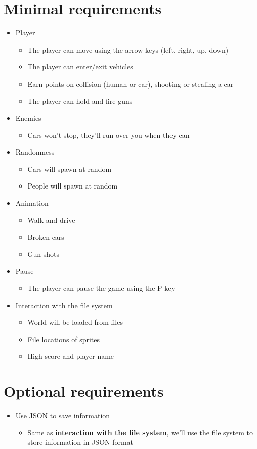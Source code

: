 \documentclass[12pt]{article}
\begin{document}
	\section{Minimal requirements}
	\begin{itemize}
		\item Player
			\begin{itemize}
				\item The player can move using the arrow keys (left, right, up, down)
				\item The player can enter/exit vehicles
				\item Earn points on collision (human or car), shooting or stealing a car
				\item The player can hold and fire guns
			\end{itemize}
		\item Enemies
			\begin{itemize}
				\item Cars won't stop, they'll run over you when they can
			\end{itemize}
		\item Randomness
			\begin{itemize}
				\item Cars will spawn at random
				\item People will spawn at random
			\end{itemize}
		\item Animation
			\begin{itemize}
				\item Walk and drive
				\item Broken cars
				\item Gun shots
			\end{itemize}
		\item Pause
			\begin{itemize}
				\item The player can pause the game using the P-key
			\end{itemize}
		\item Interaction with the file system
			\begin{itemize}
				\item World will be loaded from files
				\item File locations of sprites
				\item High score and player name
			\end{itemize}
	\end{itemize}

	\section{Optional requirements}
	\begin{itemize}
		\item Use JSON to save information
			\begin{itemize}
				\item Same as \textbf{interaction with the file system}, we'll use the file system to store information in JSON-format 
			\end{itemize}
	\end{itemize}
\end{document}

